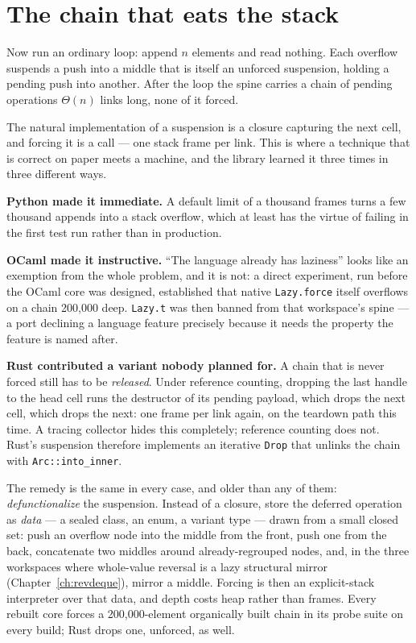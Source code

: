\documentclass[11pt,twoside,openright]{book}
\newcommand{\code}[1]{\texorpdfstring{\textcolor{d7ink}{\texttt{#1}}}{#1}}
\newcommand{\term}[1]{\textit{#1}}
\begin{document}
\section{The chain that eats the stack}

Now run an ordinary loop: append $n$ elements and read nothing. Each overflow
suspends a push into a middle that is itself an unforced suspension, holding a
pending push into another. After the loop the spine carries a chain of pending
operations $\Theta(n)$ links long, none of it forced.

The natural implementation of a suspension is a closure capturing the next cell,
and forcing it is a call --- one stack frame per link. This is where a technique
that is correct on paper meets a machine, and the library learned it three times
in three different ways.

\textbf{Python made it immediate.} A default limit of a thousand frames turns a
few thousand appends into a stack overflow, which at least has the virtue of
failing in the first test run rather than in production.

\textbf{OCaml made it instructive.} ``The language already has laziness'' looks
like an exemption from the whole problem, and it is not: a direct experiment, run
before the OCaml core was designed, established that native \code{Lazy.force}
itself overflows on a chain 200,000 deep. \code{Lazy.t} was then banned from that
workspace's spine --- a port declining a language feature precisely because it
needs the property the feature is named after.

\textbf{Rust contributed a variant nobody planned for.} A chain that is never
forced still has to be \emph{released}. Under reference counting, dropping the
last handle to the head cell runs the destructor of its pending payload, which
drops the next cell, which drops the next: one frame per link again, on the
teardown path this time. A tracing collector hides this completely; reference
counting does not. Rust's suspension therefore implements an iterative
\code{Drop} that unlinks the chain with \code{Arc::into\_inner}.

The remedy is the same in every case, and older than any of them:
\term{defunctionalize} the suspension. Instead of a
closure, store the deferred operation as \emph{data} --- a sealed class, an enum,
a variant type --- drawn from a small closed set: push an overflow node into the
middle from the front, push one from the back, concatenate two middles around
already-regrouped nodes, and, in the three workspaces where whole-value reversal
is a lazy structural mirror (Chapter~\ref{ch:revdeque}), mirror a middle.
Forcing is then an explicit-stack interpreter over that data, and depth costs
heap rather than frames. Every rebuilt core forces a 200,000-element organically
built chain in its probe suite on every build; Rust drops one, unforced, as well.
\end{document}
